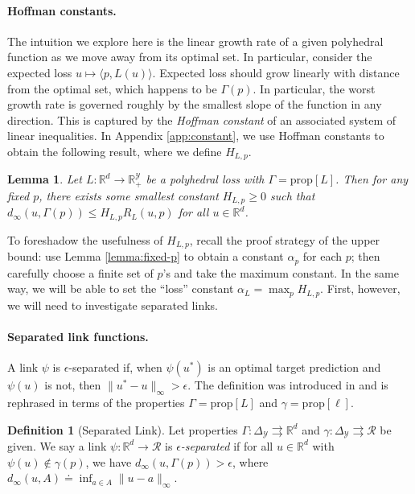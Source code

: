 \documentclass{article}
\newtheorem{lemma}{Lemma}
\theoremstyle{definition}\newtheorem{definition}{Definition}
\theoremstyle{definition}\newtheorem{assumption}{Assumption}
\newcommand{\reals}{\mathbb{R}}
\newcommand{\defeq}{\doteq}%
\newcommand{\prop}[1]{\mathrm{prop}[#1]}
\newcommand{\simplex}{\Delta_\Y}
\newcommand{\R}{\mathcal{R}}
\newcommand{\Y}{\mathcal{Y}}
\newcommand{\inprod}[2]{\langle #1, #2 \rangle}%
\newcommand{\toto}{\rightrightarrows}
\begin{document}
\paragraph{Hoffman constants.}
The intuition we explore here is the linear growth rate of a given polyhedral function as we move away from its optimal set.
In particular, consider the expected loss $u \mapsto \inprod{p}{L(u)}$.
Expected loss should grow linearly with distance from the optimal set, which happens to be $\Gamma(p)$.
In particular, the worst growth rate is governed roughly by the smallest slope of the function in any direction.
This is captured by the \emph{Hoffman constant} of an associated system of linear inequalities.
In Appendix \ref{app:constant}, we use Hoffman constants to obtain the following result, where we define $H_{L,p}$.
\begin{lemma} \label{lemma:hoffman-polyhedral}
  Let $L: \reals^d \to \reals_+^{\Y}$ be a polyhedral loss with $\Gamma = \prop{L}$.
  Then for any fixed $p$, there exists some smallest constant $H_{L,p} \geq 0$ such that $d_{\infty}(u,\Gamma(p)) \leq H_{L,p} R_L(u,p)$ for all $u \in \reals^d$.
\end{lemma}

To foreshadow the usefulness of $H_{L,p}$, recall the proof strategy of the upper bound: use Lemma \ref{lemma:fixed-p} to obtain a constant $\alpha_p$ for each $p$; then carefully choose a finite set of $p$'s and take the maximum constant.
In the same way, we will be able to set the ``loss'' constant $\alpha_L = \max_p H_{L,p}$.
First, however, we will need to investigate separated links.

\paragraph{Separated link functions.}
A link $\psi$ is $\epsilon$-separated if, when $\psi(u^*)$ is an optimal target prediction and $\psi(u)$ is not, then $\|u^* - u\|_{\infty} > \epsilon$.
The definition was introduced in \cite{finocchiaro2019embedding} and is rephrased in terms of the properties $\Gamma = \prop{L}$ and $\gamma = \prop{\ell}$.

\begin{definition}[Separated Link]\label{def:sep-link}
  Let properties $\Gamma:\simplex\toto\reals^d$ and $\gamma:\simplex\toto\R$ be given.
  We say a link $\psi:\reals^d\to\R$
  is \emph{$\epsilon$-separated} if for all $u\in\reals^d$ with $\psi(u)\notin\gamma(p)$, we have $d_\infty(u,\Gamma(p)) > \epsilon$, where $d_\infty(u,A) \defeq \inf_{a\in A} \|u-a\|_\infty$.
\end{definition}
\end{document}
